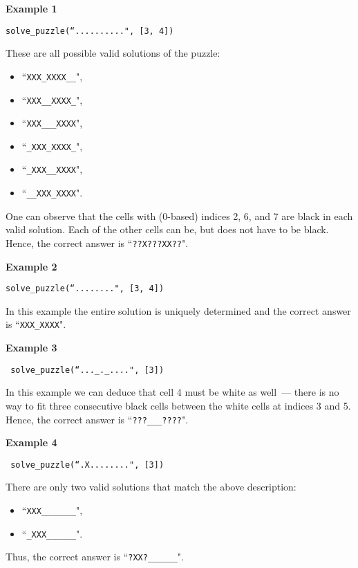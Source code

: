 \textbf{Example 1}

\texttt{solve\_puzzle(``..........", [3, 4])}

These are all possible valid solutions of the puzzle:
\begin{itemize}
\item ``\texttt{XXX\_XXXX\_\_}",
\item ``\texttt{XXX\_\_XXXX\_}",
\item ``\texttt{XXX\_\_\_XXXX}",
\item ``\texttt{\_XXX\_XXXX\_}",
\item ``\texttt{\_XXX\_\_XXXX}",
\item ``\texttt{\_\_XXX\_XXXX}".
\end{itemize}

One can observe that the cells with (0-based) indices 2, 6, and 7 are black in each valid solution. Each of
the other cells can be, but does not have to be black. Hence, the correct answer is ``\texttt{??X???XX??}".

\textbf{Example 2}

\texttt{solve\_puzzle(``........", [3, 4])}

In this example the entire solution is uniquely determined and the correct answer is ``\texttt{XXX\_XXXX}".

\textbf{Example 3}

\texttt{ solve\_puzzle(``...\_.\_....", [3]) }

In this example we can deduce that cell 4 must be white as well~--- there is no way to fit three  consecutive black
cells between the white cells at indices 3 and 5. Hence, the correct answer is ``\texttt{???\_\_\_????}".

\textbf{Example 4}

\texttt{ solve\_puzzle(``.X........", [3])}

There are only two valid solutions that match the above description:

\begin{itemize}
\item ``\texttt{XXX\_\_\_\_\_\_\_}",
\item ``\texttt{\_XXX\_\_\_\_\_\_}".
\end{itemize}

Thus, the correct answer is ``\texttt{?XX?\_\_\_\_\_\_}".

